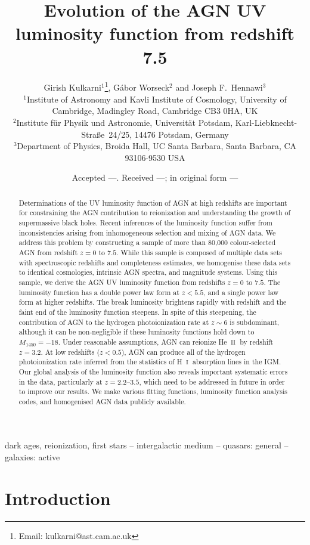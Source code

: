 \documentclass[fleqn,usenatbib]{mnras}
\title[AGN luminosity function]{Evolution of the AGN UV
  luminosity function from redshift 7.5}
\author[Kulkarni et al.]
       {{Girish Kulkarni$^{1}$\thanks{Email: kulkarni@ast.cam.ac.uk},
           G\'abor Worseck$^{2}$
           and Joseph F.~Hennawi$^{3}$} \\
         $^1$Institute of Astronomy and Kavli Institute of Cosmology,
         University of Cambridge, Madingley Road, Cambridge CB3 0HA,
         UK \\
         $^2$Institute f\"ur Physik und Astronomie, Universit\"at
         Potsdam, Karl-Liebknecht-Stra\ss e\ 24/25, 14476 Potsdam,
         Germany \\
         $^3$Department of Physics, Broida Hall, UC Santa Barbara,
         Santa Barbara, CA 93106-9530 USA}
\date{Accepted ---. Received ---; in original form ---}
\def\HI{\hbox{H~$\scriptstyle\rm I$}}
\def\HeII{\hbox{He~$\scriptstyle\rm II$}}
\begin{document}
\label{firstpage}
\pagerange{\pageref{firstpage}--\pageref{lastpage}}
\maketitle

\begin{abstract}
  Determinations of the UV luminosity function of AGN at high
  redshifts are important for constraining the AGN contribution to
  reionization and understanding the growth of supermassive black
  holes.  Recent inferences of the luminosity function suffer from
  inconsistencies arising from inhomogeneous selection and mixing of
  AGN data.  We address this problem by constructing a sample of more
  than 80,000 colour-selected AGN from redshift $z=0$ to $7.5$.  While
  this sample is composed of multiple data sets with spectroscopic
  redshifts and completeness estimates, we homogenise these data sets
  to identical cosmologies, intrinsic AGN spectra, and magnitude
  systems.  Using this sample, we derive the AGN UV luminosity
  function from redshifts $z=0$ to $7.5$.  The luminosity function has
  a double power law form at $z<5.5$, and a single power law form at
  higher redshifts.  The break luminosity brightens rapidly with
  redshift and the faint end of the luminosity function steepens.  In
  spite of this steepening, the contribution of AGN to the hydrogen
  photoionization rate at $z\sim 6$ is subdominant, although it can be
  non-negligible if these luminosity functions hold down to
  $M_{1450}=-18$.  Under reasonable assumptions, AGN can reionize
  \HeII\ by redshift $z=3.2$.  At low redshifts ($z<0.5$), AGN can
  produce all of the hydrogen photoionization rate inferred from the
  statistics of \HI\ absorption lines in the IGM.  Our global analysis
  of the luminosity function also reveals important systematic errors
  in the data, particularly at $z=2.2$--$3.5$, which need to be
  addressed in future in order to improve our results.  We make
  various fitting functions, luminosity function analysis codes, and
  homogenised AGN data publicly available.
\end{abstract}

\begin{keywords}
  dark ages, reionization, first stars -- intergalactic medium --
  quasars: general -- galaxies: active
\end{keywords}

\section{Introduction}
\end{document}

